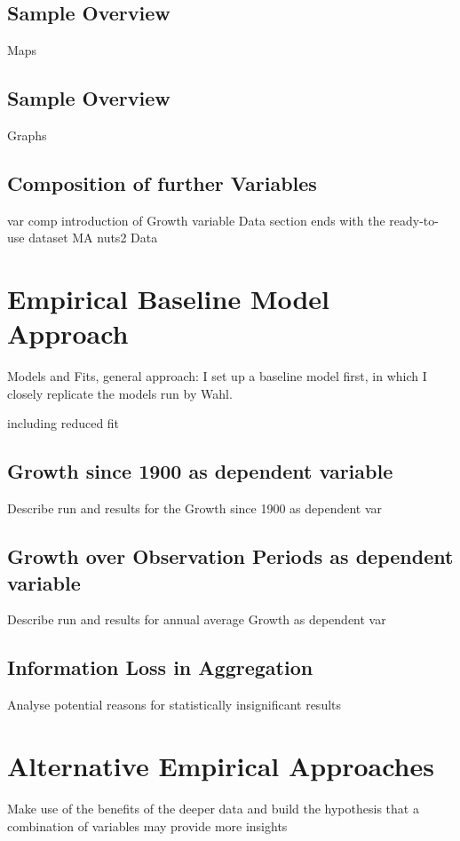 \documentclass[
12pt, %
english, %
onehalfspacing, %
oneside,
headsepline, %
openany
]{MastersDoctoralThesis} %
\begin{document}
\subsection{Sample Overview}
Maps
\subsection{Sample Overview}
Graphs

\subsection{Composition of further Variables}
var comp
introduction of Growth variable
Data section ends with the ready-to-use dataset MA nuts2 Data


\section{Empirical Baseline Model Approach}
Models and Fits, general approach:
I set up a baseline model first, in which I closely replicate the models run by Wahl.

including reduced fit

\subsection{Growth since 1900 as dependent variable}

Describe run and results for the Growth since 1900 as dependent var

\subsection{Growth over Observation Periods as dependent variable}

Describe run and results for annual average Growth as dependent var

\subsection{Information Loss in Aggregation}
Analyse potential reasons for statistically insignificant results

\section{Alternative Empirical Approaches}
Make use of the benefits of the deeper data and build the hypothesis that a combination of variables may provide more insights 
\end{document}
